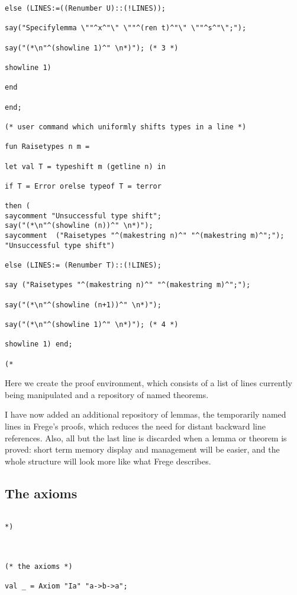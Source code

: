 \documentclass{article}
\begin{document}
{{\begin {verbatim}
else (LINES:=((Renumber U)::(!LINES));

say("Specifylemma \""^x^"\" \""^(ren t)^"\" \""^s^"\";");

say("(*\n"^(showline 1)^" \n*)"); (* 3 *)

showline 1)

end

end;

(* user command which uniformly shifts types in a line *)

fun Raisetypes n m =

let val T = typeshift m (getline n) in

if T = Error orelse typeof T = terror 

then (
saycomment "Unsuccessful type shift";
say("(*\n"^(showline (n))^" \n*)"); 
saycomment  ("Raisetypes "^(makestring n)^" "^(makestring m)^";");
"Unsuccessful type shift")

else (LINES:= (Renumber T)::(!LINES);

say ("Raisetypes "^(makestring n)^" "^(makestring m)^";");

say("(*\n"^(showline (n+1))^" \n*)"); 

say("(*\n"^(showline 1)^" \n*)"); (* 4 *)

showline 1) end;

(*

\end{verbatim}

Here we create the proof environment, which consists of a list of lines currently being manipulated and a repository of named theorems.

I have now added an additional repository of lemmas, the temporarily named lines in Frege's proofs, which reduces the need for distant backward line references.
Also, all but the last line is discarded when a lemma or theorem is proved:  short term memory display and management will be easier, and the whole structure will look more
like what Frege describes.

\subsection{The axioms}

\begin{verbatim}

*)



(* the axioms *)

val _ = Axiom "Ia" "a->b->a";


\end{verbatim}}}
\end{document}
